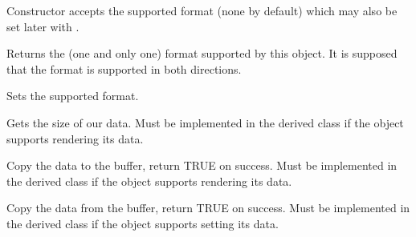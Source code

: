 
Constructor accepts the supported format (none by default) which may also be
set later with .

\label{wxdataobjectsimplegetformat}


Returns the (one and only one) format supported by this object. It is supposed
that the format is supported in both directions.

\label{wxdataobjectsimplesetformat}


Sets the supported format.

\label{wxdataobjectsimplegetdatasize}


Gets the size of our data. Must be implemented in the derived class if the
object supports rendering its data.

\label{wxdataobjectsimplegetdatahere}


Copy the data to the buffer, return TRUE on success. Must be implemented in the
derived class if the object supports rendering its data.


\label{wxdataobjectsimplesetdata}


Copy the data from the buffer, return TRUE on success. Must be implemented in
the derived class if the object supports setting its data.


